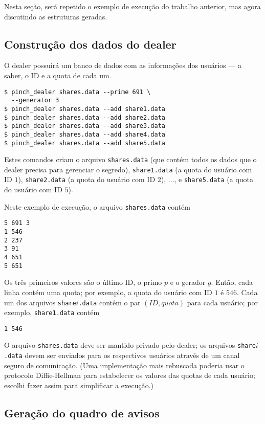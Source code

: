 \documentclass[10pt,twocolumn]{article}
\begin{document}
Nesta seção,
será repetido o exemplo de execução do trabalho anterior,
mas agora discutindo as estruturas geradas.

\subsection{Construção dos dados do dealer}

O dealer possuirá um banco de dados com as informações dos usuários
--- a saber, o ID e a quota de cada um.

\begin{verbatim}
$ pinch_dealer shares.data --prime 691 \
  --generator 3
$ pinch_dealer shares.data --add share1.data
$ pinch_dealer shares.data --add share2.data
$ pinch_dealer shares.data --add share3.data
$ pinch_dealer shares.data --add share4.data
$ pinch_dealer shares.data --add share5.data
\end{verbatim}
Estes comandos criam o arquivo \verb"shares.data"
(que contém todos os dados que o dealer precisa para gerenciar o segredo),
\verb"share1.data" (a quota do usuário com ID $1$),
\verb"share2.data" (a quota do usuário com ID $2$),
$\ldots$,
e \verb"share5.data" (a quota do usuário com ID $5$).

Neste exemplo de execução, o arquivo \verb"shares.data" contém
\begin{verbatim}
5 691 3
1 546
2 237
3 91
4 651
5 651
\end{verbatim}
Os três primeiros valores são o último ID,
o primo $p$ e o gerador $g$.
Então, cada linha contém uma quota;
por exemplo, a quota do usuário com ID $1$ é $546$.
Cada um dos arquivos \verb$share$$i$\verb$.data$
contém o par $(ID, quota)$ para cada usuário;
por exemplo,
\verb"share1.data" contém
\begin{verbatim}
1 546
\end{verbatim}

O arquivo \verb"shares.data" deve ser mantido privado pelo dealer;
os arquivos \verb"share"$i$\verb".data" devem ser enviados para os respectivos usuários
através de um canal seguro de comunicação.
(Uma implementação mais rebuscada poderia usar o protocolo Diffie-Hellman
para estabelecer os valores das quotas de cada usuário;
escolhi fazer assim para simplificar a execução.)

\subsection{Geração do quadro de avisos}
\end{document}
